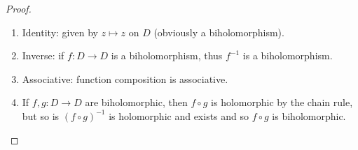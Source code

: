 \begin{proof}
    \begin{enumerate}
        \item Identity: given by $z \mapsto z$ on $D$ (obviously a biholomorphism).
        \item Inverse: if $f: D \to D$ is a biholomorphism, thus $f^{-1}$ is a biholomorphism.
        \item Associative: function composition is associative.
        \item If $f, g : D \to D$ are biholomorphic, then $f \circ g$ is holomorphic by the chain rule, but so is $(f \circ g)^{-1}$ is holomorphic and exists and so $f \circ g$ is biholomorphic.
    \end{enumerate}
\end{proof}
